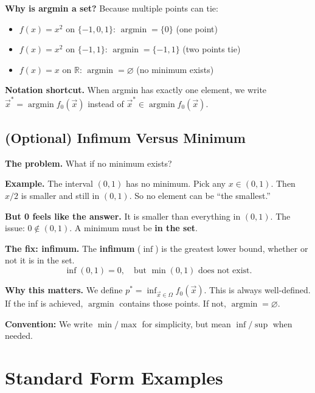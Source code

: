 \documentclass[10pt, twocolumn]{article}
\theoremstyle{definition}
\theoremstyle{plain}
\newcommand{\RR}{\mathbb{R}}
\DeclareMathOperator{\argmin}{argmin}
\DeclareMathOperator{\Inf}{inf}
\DeclareMathOperator{\Sup}{sup}
\begin{document}
\textbf{Why is argmin a set?} Because multiple points can tie:
\begin{itemize}
    \item $f(x) = x^2$ on $\{-1, 0, 1\}$: $\argmin = \{0\}$ (one point)
    \item $f(x) = x^2$ on $\{-1, 1\}$: $\argmin = \{-1, 1\}$ (two points tie)
    \item $f(x) = x$ on $\RR$: $\argmin = \varnothing$ (no minimum exists)
\end{itemize}

\textbf{Notation shortcut.} When argmin has exactly one element, we write $\vec{x}^* = \argmin f_0(\vec{x})$ instead of $\vec{x}^* \in \argmin f_0(\vec{x})$.

\subsection{(Optional) Infimum Versus Minimum}

\textbf{The problem.} What if no minimum exists?

\textbf{Example.} The interval $(0,1)$ has no minimum. Pick any $x \in (0,1)$. Then $x/2$ is smaller and still in $(0,1)$. So no element can be ``the smallest.''

\textbf{But 0 feels like the answer.} It is smaller than everything in $(0,1)$. The issue: $0 \notin (0,1)$. A minimum must be \textbf{in the set}.

\textbf{The fix: infimum.} The \textbf{infimum} ($\Inf$) is the greatest lower bound, whether or not it is in the set.
\[
    \Inf(0,1) = 0, \quad \text{but } \min(0,1) \text{ does not exist.}
\]

\textbf{Why this matters.} We define $p^* = \Inf_{\vec{x} \in \Omega} f_0(\vec{x})$. This is always well-defined. If the inf is achieved, $\argmin$ contains those points. If not, $\argmin = \varnothing$.

\begin{tcolorbox}[colframe=black!50]
\textbf{Convention:} We write $\min/\max$ for simplicity, but mean $\Inf/\Sup$ when needed.
\end{tcolorbox}

\section{Standard Form Examples}
\end{document}
